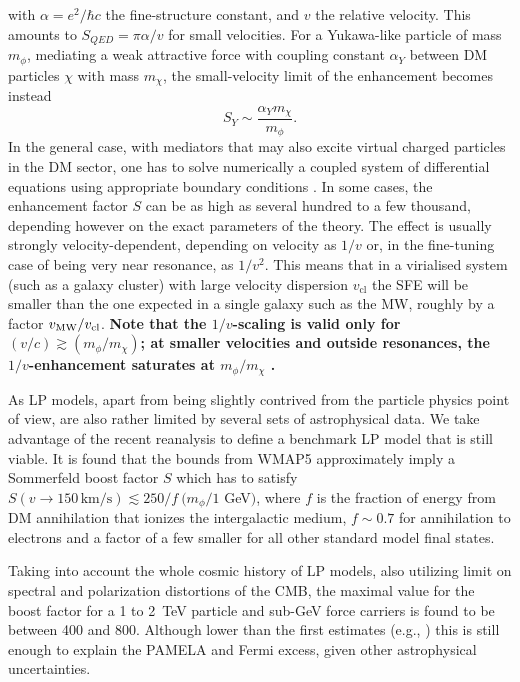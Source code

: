 \documentclass[10pt,aps,pra,reprint,amsmath,amsfonts,amssymb,showpacs,nofootinbib,floatfix]{revtex4-1}
\def\C#1{{\bf #1}}
\newcommand{\rmn}{\mathrm}
\newcommand{\sigv}{v_\rmn{cl}}
\begin{document}
with $\alpha =e^2/\hbar c$ the fine-structure constant, and $v$ the relative
velocity. This amounts to $S_{QED}=\pi\alpha/v$ for small velocities. For a
Yukawa-like particle of mass $m_\phi$, mediating a weak attractive force with
coupling constant $\alpha_Y$ between DM particles $\chi$ with mass
$m_\chi$, the small-velocity limit of the enhancement becomes instead
\begin{equation}
S_Y\sim\frac{\alpha_Y m_\chi}{m_\phi}.
\label{eq:saturation}
\end{equation}
In the general case, with mediators that may also excite virtual
charged particles in the DM sector, one has to solve numerically a
coupled system of differential equations using appropriate boundary
conditions
\cite{2005PhRvD..71f3528H,2007NuPhB.787..152C,2009PhRvD..79a5014A}. In
some cases, the enhancement factor $S$ can be as high as several
hundred to a few thousand, depending however on the exact parameters
of the theory. The effect is usually strongly velocity-dependent,
depending on velocity as $1/v$ or, in the fine-tuning case of being
very near resonance, as $1/v^2$. This means that in a virialised
system (such as a galaxy cluster) with large velocity dispersion
$\sigv$ the SFE will be smaller than the one expected in a single
galaxy such as the MW, roughly by a factor $v_{\rm MW}/\sigv$. \C{Note
  that the $1/v$-scaling is valid only for $(v/c) \gtrsim
  (m_\phi/m_\chi)$; at smaller velocities and outside resonances, the
  $1/v$-enhancement saturates at $m_\phi/m_\chi$
  \cite{2008PhRvL.101z1301K}.}

As LP models, apart from being slightly contrived from the particle
physics point of view, are also rather limited by several sets of
astrophysical data. We take advantage of the recent reanalysis
\cite{Finkbeiner:2010sm} to define a benchmark LP model that is still
viable.  It is found that the bounds from WMAP5 approximately imply a
Sommerfeld boost factor $S$ which has to satisfy $S(v\to
150\,\rmn{km}/\rmn{s})\lesssim 250/f\ (m_\phi/1$ GeV$)$, where $f$ is
the fraction of energy from DM annihilation that ionizes the
intergalactic medium, $f\sim 0.7$ for annihilation to electrons and a
factor of a few smaller for all other standard model final states.

Taking into account the whole cosmic history of LP models, also
utilizing limit on spectral and polarization distortions of the CMB,
the maximal value for the boost factor for a 1 to 2~TeV particle and
sub-GeV force carriers is found to be \cite{Finkbeiner:2010sm} between
400 and 800. Although lower than the first estimates (e.g.,
\cite{Bergstrom:2009fa,Meade:2009iu}) this is still enough to explain
the PAMELA and Fermi excess, given other astrophysical uncertainties.
\end{document}
